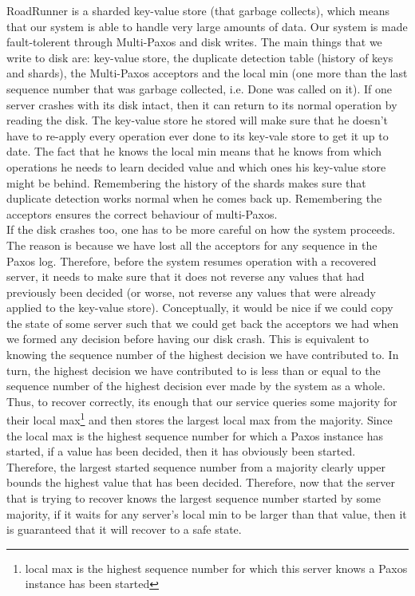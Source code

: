 \documentclass[a4paper]{article}
\begin{document}
RoadRunner is a sharded key-value store (that garbage collects), which means that our system is able to handle very large amounts of data.
Our system is made fault-tolerent through Multi-Paxos and disk writes.
The main things that we write to disk are: key-value store, the duplicate detection table (history of keys and shards), the Multi-Paxos acceptors and the local min (one more than the last sequence number that was garbage collected, i.e. Done was called on it).
If one server crashes with its disk intact, then it can return to its normal operation by reading the disk.
The key-value store he stored will make sure that he doesn't have to re-apply every operation ever done to its key-vale store to get it up to date.
The fact that he knows the local min means that he knows from which operations he needs to learn decided value and which ones his key-value store might be behind. 
Remembering the history of the shards makes sure that duplicate detection works normal when he comes back up.
Remembering the acceptors  ensures the correct behaviour of multi-Paxos.\\
\indent If the disk crashes too, one has to be more careful on how the system proceeds.
The reason is because we have lost all the acceptors for any sequence in the Paxos log.
Therefore, before the system resumes operation with a recovered server, it needs to make sure that it does not reverse any values that had previously been decided (or worse, not reverse any values that were already applied to the key-value store).
Conceptually, it would be nice if we could copy the state of some server such that we could get back the acceptors we had when we formed any decision before having our disk crash.
This is equivalent to knowing the sequence number of the highest decision we have contributed to. 
In turn, the highest decision we have contributed to is less than or equal to the sequence number of the highest decision ever made by the system as a whole.
Thus, to recover correctly, its enough that our service queries some majority for their 
local max\footnote{local max is the highest sequence number for which this server knows a Paxos instance has been started} 
and then stores the largest local max from the majority.
Since the local max is the highest sequence number for which a Paxos instance has started, if a value has been decided, then it has obviously been started.
Therefore, the largest started sequence number from a majority clearly upper bounds the highest value that has been decided.
Therefore, now that the server that is trying to recover knows the largest sequence number started by some majority, if it waits for any server's local min to be larger than that value, then it is guaranteed that it will recover to a safe state.
\end{document}

